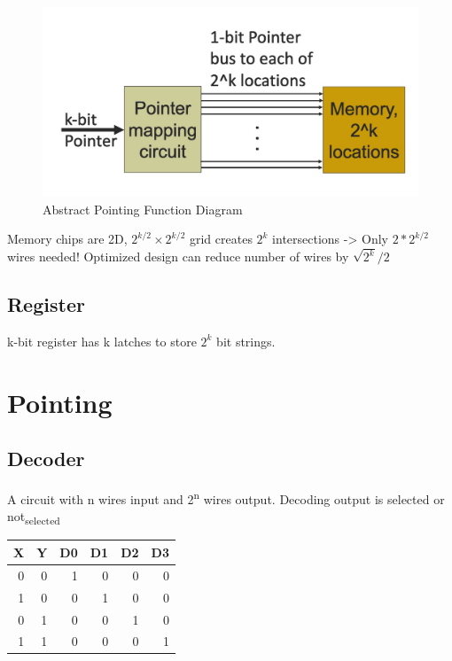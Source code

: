 \documentclass[11pt]{article}
\begin{document}
\begin{figure}[htbp]
\centering
\includegraphics[width=.9\linewidth]{./img/pointing_function.jpg}
\caption{\label{fig:org2ff79ef}Abstract Pointing Function Diagram}
\end{figure}

Memory chips are 2D, \(2^{k/2} \times 2^{k/2}\) grid creates \(2^k\) intersections -> Only \(2 * 2^{k/2}\) wires needed! Optimized design can reduce number of wires by \(\sqrt{2^k} / 2\)

\subsection{Register}
\label{sec:orga83763c}

k-bit register has k latches to store \(2^k\) bit strings.

\section{Pointing}
\label{sec:org2e36d06}

\subsection{Decoder}
\label{sec:org9b1b19c}

A circuit with n wires input and 2\textsuperscript{n} wires output. Decoding output is selected or not\textsubscript{selected}

\begin{center}
\begin{tabular}{rrrrrr}
X & Y & D0 & D1 & D2 & D3\\
\hline
0 & 0 & 1 & 0 & 0 & 0\\
1 & 0 & 0 & 1 & 0 & 0\\
0 & 1 & 0 & 0 & 1 & 0\\
1 & 1 & 0 & 0 & 0 & 1\\
\end{tabular}
\end{center}
\end{document}
